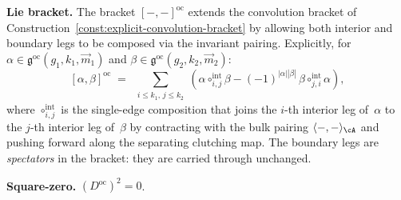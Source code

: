\begin{theorem}
\noindent\textbf{Lie bracket.}
The bracket $[-,-]^{\mathrm{oc}}$ extends the convolution bracket of
Construction~\textup{\ref{const:explicit-convolution-bracket}} by
allowing both interior and boundary legs to be composed via the
invariant pairing. Explicitly, for
$\alpha \in \mathfrak{g}^{\mathrm{oc}}(g_1, k_1, \vec{m}_1)$ and
$\beta \in \mathfrak{g}^{\mathrm{oc}}(g_2, k_2, \vec{m}_2)$:
\begin{equation}\label{eq:oc-bracket}
[\alpha, \beta]^{\mathrm{oc}}
\;=\;
\sum_{\substack{i \leq k_1,\, j \leq k_2}}
(\alpha \circ_{i,j}^{\mathrm{int}} \beta
- (-1)^{|\alpha||\beta|}\,
\beta \circ_{j,i}^{\mathrm{int}} \alpha),
\end{equation}
where $\circ_{i,j}^{\mathrm{int}}$ is the single-edge composition
that joins the $i$-th interior leg of~$\alpha$ to the $j$-th
interior leg of~$\beta$ by contracting with the bulk pairing
$\langle -, - \rangle_\cA$ and pushing forward along the
separating clutching map. The boundary legs are
\emph{spectators} in the bracket: they are carried through
unchanged.

\noindent\textbf{Square-zero.}
$(D^{\mathrm{oc}})^2 = 0$.
\end{theorem}

